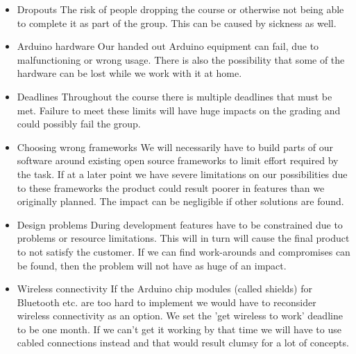 \begin{itemize}

\item{Dropouts}\newline
The risk of people dropping the course or otherwise not being able to complete it as part
of the group. This can be caused by sickness as well.

\item{Arduino hardware}\newline
Our handed out Arduino equipment can fail, due to malfunctioning or wrong usage.
There is also the possibility that some of the hardware can be lost while we work with it at home.

\item{Deadlines}\newline
Throughout the course there is multiple deadlines that must be met. Failure to meet
these limits will have huge impacts on the grading and could possibly fail the group.

\item{Choosing wrong frameworks}\newline
We will necessarily have to build parts of our software around existing open source
frameworks to limit effort required by the task. If at a later point we have severe limitations
on our possibilities due to these frameworks the product could result poorer in features than
we originally planned. The impact can be negligible if other solutions are found.

\item{Design problems}\newline
During development features have to be constrained due to problems or resource limitations.
This will in turn will cause the final product to not satisfy the customer. If we can find work-arounds
and compromises can be found, then the problem will not have as huge of an impact.

\item{Wireless connectivity}\newline
If the Arduino chip modules (called shields) for Bluetooth etc. are too hard to implement
we would have to reconsider wireless connectivity as an option.
We set the 'get wireless to work' deadline to be one month. If we can't get it working
by that time we will have to use cabled connections instead and that would result clumsy
for a lot of concepts.
\end{itemize}

